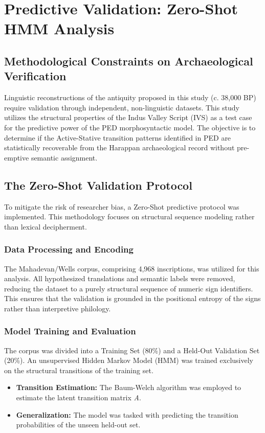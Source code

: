 \chapter{Predictive Validation: Zero-Shot HMM Analysis}

\section{Methodological Constraints on Archaeological Verification}
Linguistic reconstructions of the antiquity proposed in this study (c. 38,000 BP) require validation through independent, non-linguistic datasets. This study utilizes the structural properties of the Indus Valley Script (IVS) as a test case for the predictive power of the PED morphosyntactic model. The objective is to determine if the Active-Stative transition patterns identified in PED are statistically recoverable from the Harappan archaeological record without pre-emptive semantic assignment.

\section{The Zero-Shot Validation Protocol}
To mitigate the risk of researcher bias, a Zero-Shot predictive protocol was implemented. This methodology focuses on structural sequence modeling rather than lexical decipherment.

\subsection{Data Processing and Encoding}
The Mahadevan/Wells corpus, comprising 4,968 inscriptions, was utilized for this analysis. All hypothesized translations and semantic labels were removed, reducing the dataset to a purely structural sequence of numeric sign identifiers. This ensures that the validation is grounded in the positional entropy of the signs rather than interpretive philology.

\subsection{Model Training and Evaluation}
The corpus was divided into a Training Set (80\%) and a Held-Out Validation Set (20\%). An unsupervised Hidden Markov Model (HMM) was trained exclusively on the structural transitions of the training set.
\begin{itemize}
    \item \textbf{Transition Estimation:} The Baum-Welch algorithm was employed to estimate the latent transition matrix \textit{A}.
    \item \textbf{Generalization:} The model was tasked with predicting the transition probabilities of the unseen held-out set.
\end{itemize}

